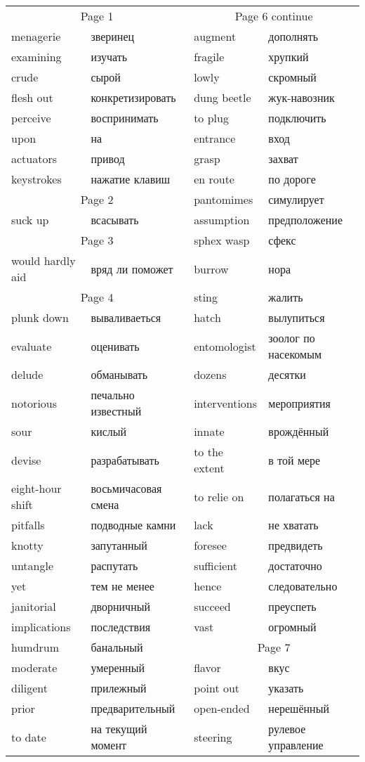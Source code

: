 \documentclass[12pt]{article}
\begin{document}
\begin{tabular}{| l l | l l | }
  \hline
  \multicolumn{2}{|c|}{Page 1} & \multicolumn{2}{c|}{Page 6 continue} \\
  menagerie & зверинец & augment & дополнять\\
  examining & изучать & fragile & хрупкий \\
  crude & сырой & lowly & скромный\\
  flesh out & конкретизировать & dung beetle & жук-навозник \\
  perceive & воспринимать & to plug & подключить \\
  upon & на & entrance & вход \\
  actuators & привод & grasp & захват \\
  keystrokes & нажатие клавиш & en route & по дороге \\
  
  \cline{1-2} \multicolumn{2}{|c|}{Page 2} & pantomimes & симулирует\\
  suck up & всасывать & assumption & предположение \\

  \cline{1-2} \multicolumn{2}{|c|}{Page 3} & sphex wasp & сфекс\\
  would hardly aid & вряд ли поможет & burrow & нора \\
  
  \cline{1-2} \multicolumn{2}{|c|}{Page 4} & sting & жалить\\
  plunk down & вываливаеться & hatch & вылупиться \\
  evaluate & оценивать & entomologist & зоолог по насекомым \\  
  delude & обманывать & dozens & десятки \\
  notorious & печально известный & interventions & мероприятия \\
  sour & кислый & innate & врождённый \\
  devise & разрабатывать & to the extent & в той мере \\
  eight-hour shift & восьмичасовая смена & to relie on & полагаться на \\
  pitfalls & подводные камни & lack & не хватать \\
  knotty & запутанный & foresee & предвидеть \\
  untangle & распутать & sufficient & достаточно \\
  yet & тем не менее & hence & следовательно \\
  janitorial & дворничный & succeed & преуспеть \\
  implications & последствия & vast & огромный \\ \cline{3-4}
  humdrum & банальный & \multicolumn{2}{c|}{Page 7} \\
  moderate & умеренный & flavor & вкус \\
  diligent & прилежный & point out & указать \\ 
  prior & предварительный & open-ended & нерешённый \\
  to date & на текущий момент & steering & рулевое управление \\
 

\end{tabular}
\end{document}
